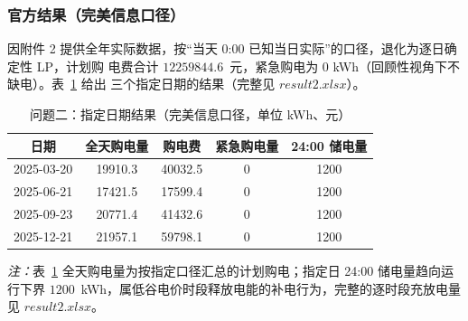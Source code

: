 \documentclass[withoutpreface]{cumcmthesis}
\begin{document}
\subsubsection{官方结果（完美信息口径）}
因附件 2 提供全年实际数据，按“当天 0:00 已知当日实际”的口径，退化为逐日确定性 LP，计划购
电费合计 $12259844.6$~元，紧急购电为 0 kWh（回顾性视角下不缺电）。表~\ref{tab:q2} 给出
三个指定日期的结果（完整见 $result2.xlsx$）。
\begin{table}[H]
    \centering
    \caption{问题二：指定日期结果（完美信息口径，单位 kWh、元）}\label{tab:q2}
    \begin{tabular}{ccccc}
        \toprule[0.8pt]
        日期 & 全天购电量 & 购电费 & 紧急购电量 & 24:00 储电量 \\
        \midrule[0.5pt]
        2025-03-20 & 19910.3 & 40032.5 & 0 & 1200 \\
        2025-06-21 & 17421.5 & 17599.4 & 0 & 1200 \\
        2025-09-23 & 20771.4 & 41432.6 & 0 & 1200 \\
        2025-12-21 & 21957.1 & 59798.1 & 0 & 1200 \\
        \bottomrule[0.8pt]
    \end{tabular}
\end{table}
\noindent\textit{注：}表~\ref{tab:q2} 全天购电量为按指定口径汇总的计划购电；指定日 24:00
储电量趋向运行下界 $1200$~kWh，属低谷电价时段释放电能的补电行为，完整的逐时段充放电量见
$result2.xlsx$。
\end{document}
